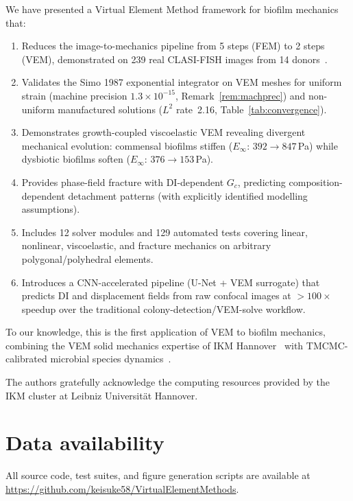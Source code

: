 \documentclass[smallextended]{svjour3}
\begin{document}
We have presented a Virtual Element Method framework for biofilm
mechanics that:
\begin{enumerate}[nosep]
  \item Reduces the image-to-mechanics pipeline from 5 steps
    (FEM) to 2 steps (VEM), demonstrated on 239 real CLASI-FISH
    images from 14 donors~\cite{MorilloLopez2022}.
  \item Validates the Simo 1987 exponential integrator on VEM meshes
    for uniform strain (machine precision $1.3 \times 10^{-15}$,
    Remark~\ref{rem:machprec}) and non-uniform manufactured
    solutions ($L^2$ rate~2.16, Table~\ref{tab:convergence}).
  \item Demonstrates growth-coupled viscoelastic VEM revealing
    divergent mechanical evolution: commensal biofilms stiffen
    ($E_\infty$: $392 \to 847$\,Pa) while dysbiotic biofilms soften
    ($E_\infty$: $376 \to 153$\,Pa).
  \item Provides phase-field fracture with DI-dependent $G_c$,
    predicting composition-dependent detachment patterns
    (with explicitly identified modelling assumptions).
  \item Includes 12 solver modules and 129 automated tests
    covering linear, nonlinear, viscoelastic, and fracture
    mechanics on arbitrary polygonal/polyhedral elements.
  \item Introduces a CNN-accelerated pipeline (U-Net + VEM surrogate)
    that predicts DI and displacement fields from raw confocal
    images at $>100\times$ speedup over the traditional
    colony-detection/VEM-solve workflow.
\end{enumerate}
To our knowledge, this is the first application of VEM to
biofilm mechanics, combining the VEM solid mechanics expertise
of IKM Hannover~\cite{Wriggers2024,Aldakheel2018} with
TMCMC-calibrated microbial species dynamics~\cite{Klempt2024}.

\begin{acknowledgements}
The authors gratefully acknowledge the computing resources provided
by the IKM cluster at Leibniz Universit\"at Hannover.
\end{acknowledgements}

\section*{Data availability}

All source code, test suites, and figure generation scripts are
available at
\url{https://github.com/keisuke58/VirtualElementMethods}.



\end{document}
